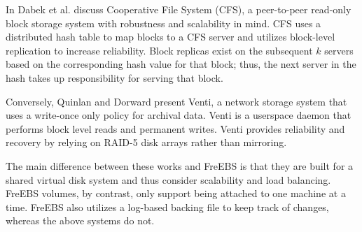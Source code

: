 In \cite{dabek2001wide} Dabek et al. discuss Cooperative File System (CFS), 
a peer-to-peer read-only block storage system with robustness and 
scalability in mind. CFS uses a distributed hash table to map blocks to a CFS
server and utilizes block-level replication to increase reliability. 
Block replicas exist on the subsequent $k$ servers based on the corresponding
hash value for that block; thus, the next server in the hash takes up 
responsibility for serving that block.  

Conversely, Quinlan and Dorward present Venti, a network storage system that
uses a write-once only policy for archival data\cite{quinlan2002venti}. Venti
is a userspace daemon that performs block level reads and permanent writes. 
Venti provides reliability and recovery by relying on RAID-5 disk arrays 
rather than mirroring.  

The main difference between these works and FreEBS is that they are built 
for a shared virtual disk system and thus consider scalability and load
balancing. FreEBS volumes, by contrast, only support being attached to one 
machine at a time. FreEBS also utilizes a log-based backing file to keep
track of changes, whereas the above systems do not.
